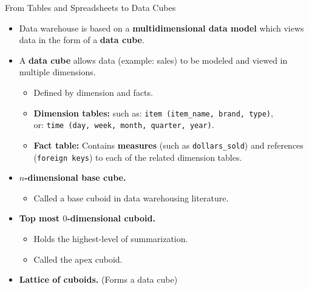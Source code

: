 \begin{frame}{From Tables and Spreadsheets to Data Cubes}
	\begin{itemize}
		\item Data warehouse is based on a \textbf{\color{airforceblue}multidimensional data model} which views data in the form of a \textbf{data cube}.
		\item A {\color{faugray}\textbf{data cube}} allows data (example: sales) to be modeled and viewed in multiple dimensions.
		      \begin{itemize}
			      \item Defined by dimension and facts.
			      \item \textbf{Dimension tables:} such as: \texttt{item (item\_name, brand, type)},\\
			            or: \texttt{time (day, week, month, quarter, year)}.
			      \item \textbf{Fact table:} Contains \textbf{measures} (such as \texttt{dollars\_sold}) and references (\texttt{foreign keys}) to each of the related dimension tables.
		      \end{itemize}
		\item \textbf{$n$-dimensional base cube.}
		      \begin{itemize}
			      \item Called a base cuboid in data warehousing literature.
		      \end{itemize}
		\item \textbf{Top most $0$-dimensional cuboid.}
		      \begin{itemize}
			      \item Holds the highest-level of summarization.
			      \item Called the apex cuboid.
		      \end{itemize}
		\item \textbf{Lattice of cuboids.} (Forms a data cube)
	\end{itemize}
\end{frame}

